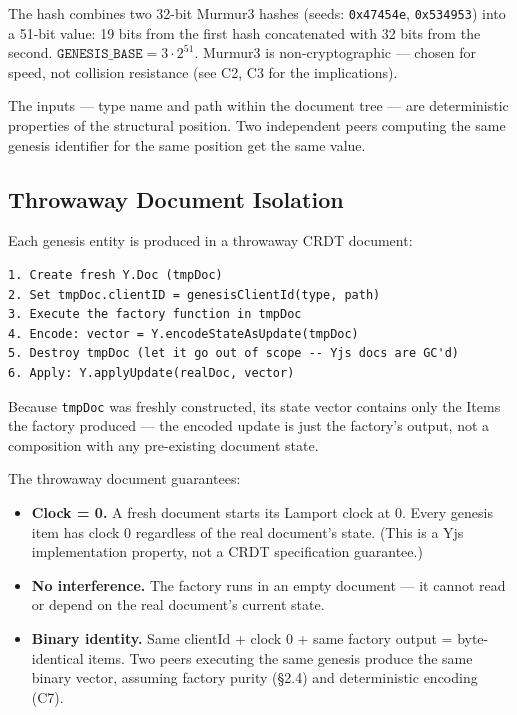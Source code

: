 The hash combines two 32-bit Murmur3 hashes (seeds: \texttt{0x47454e}, \texttt{0x534953}) into a 51-bit value: 19 bits from the first hash concatenated with 32 bits from the second. $\texttt{GENESIS\_BASE} = 3 \cdot 2^{51}$. Murmur3 is non-cryptographic --- chosen for speed, not collision resistance (see C2, C3 for the implications).

The inputs --- type name and path within the document tree --- are deterministic properties of the structural position. Two independent peers computing the same genesis identifier for the same position get the same value.

\subsection{Throwaway Document Isolation}

Each genesis entity is produced in a throwaway CRDT document:

\begin{lstlisting}
1. Create fresh Y.Doc (tmpDoc)
2. Set tmpDoc.clientID = genesisClientId(type, path)
3. Execute the factory function in tmpDoc
4. Encode: vector = Y.encodeStateAsUpdate(tmpDoc)
5. Destroy tmpDoc (let it go out of scope -- Yjs docs are GC'd)
6. Apply: Y.applyUpdate(realDoc, vector)
\end{lstlisting}

Because \texttt{tmpDoc} was freshly constructed, its state vector contains only the Items the factory produced --- the encoded update is just the factory's output, not a composition with any pre-existing document state.

The throwaway document guarantees:

\begin{itemize}
    \item \textbf{Clock = 0.} A fresh document starts its Lamport clock at 0. Every genesis item has clock 0 regardless of the real document's state. (This is a Yjs implementation property, not a CRDT specification guarantee.)
    \item \textbf{No interference.} The factory runs in an empty document --- it cannot read or depend on the real document's current state.
    \item \textbf{Binary identity.} Same clientId + clock 0 + same factory output = byte-identical items. Two peers executing the same genesis produce the same binary vector, assuming factory purity (\S2.4) and deterministic encoding (C7).
\end{itemize}

